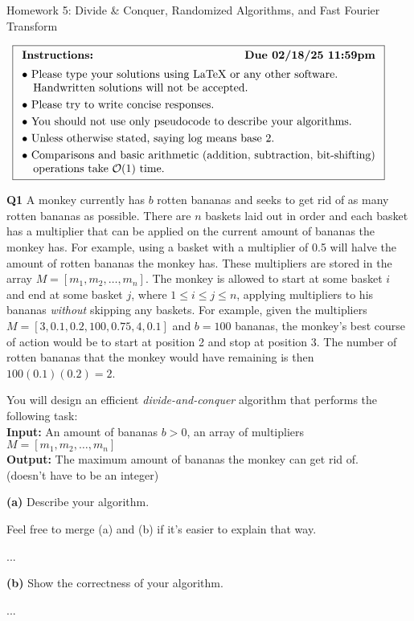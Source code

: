 \documentclass[12pt]{article}
\newcommand{\question}[3][Q]{
\begin{description}
\item \textbf{#1{#2}} #3
\end{description}
}
\newcommand{\note}[1]{{\footnotesize
    \begin{description}
    [leftmargin=3.4em,style=nextline]
        \item[Note:] {#1}
    \end{description}}   
}
\renewcommand\maketitle{
\thispagestyle{firstpage}
\begin{center}
\fontsize{20}{0}\selectfont
\assignmentTitle
\end{center}
\begin{center}
$\begin{array}{l}\fbox{$\begin{array}{l}\textbf{Instructions: } \hfill \textbf{Due \dueOn} \\[0.5em] \bullet\ \text{Please type your solutions using LaTeX or any other software.} \\ \hspace{1em} \text{Handwritten solutions will not be accepted.} \\[0.3em] \bullet\ \text{Please try to write concise responses.} \\[0.3em]  \bullet\ \text{You should not use only pseudocode to describe your algorithms.} \\[0.3em] \bullet\ \text{Unless otherwise stated, saying $\log$ means base 2.} \\[0.3em] \bullet\ \text{Comparisons and basic arithmetic (addition, subtraction, bit-shifting)} \\ \hspace{1em}\text{operations take $\bigO(1)$ time.} \end{array}$} \end{array}$ \end{center}}
\newcommand{\bigO}{\mathcal{O}}
\begin{document}
\newcommand{\assignmentTitle}{Homework 5: Divide \& Conquer, Randomized Algorithms, and Fast Fourier Transform}
\newcommand{\dueOn}{02/18/25 11:59pm}




\newcommand{\studentName}{Your name}
\newcommand{\collaborators}{any collaborators}

\maketitle

\newpage

\question{1}{
    A monkey currently has $b$ rotten bananas and seeks to get rid of as many rotten bananas as possible. There are $n$ baskets laid out in order and each basket has a multiplier that can be applied on the current amount of bananas the monkey has. For example, using a basket with a multiplier of 0.5 will halve the amount of rotten bananas the monkey has. These multipliers are stored in the array $M = [m_1, m_2, \dots, m_n]$. The monkey is allowed to start at some basket $i$ and end at some basket $j$, where $1 \le i \le j \le n$, applying multipliers to his bananas \textit{without} skipping any baskets. For example, given the multipliers $M = [3, 0.1, 0.2, 100, 0.75, 4, 0.1]$ and $b = 100$ bananas, the monkey's best course of action would be to start at position 2 and stop at position 3. The number of rotten bananas that the monkey would have remaining is then $100(0.1)(0.2) = 2$. 

    You will design an efficient \textit{divide-and-conquer} algorithm that performs the following task:\\

    \textbf{Input:} An amount of bananas $b > 0$, an array of multipliers $M = [m_1, m_2, \dots, m_n]$\\
    \textbf{Output:} The maximum amount of bananas the monkey can get rid of. \\
    \phantom{.}\hspace{4.2em}(doesn't have to be an integer)
}

\question[]{(a)}{
    Describe your algorithm.
    \note{Feel free to merge (a) and (b) if it's easier to explain that way.}
}
\begin{answer}
    ...
\end{answer}

\question[]{(b)}{
    Show the correctness of your algorithm.
}
\begin{answer}
    ...
\end{answer}
\end{document}
